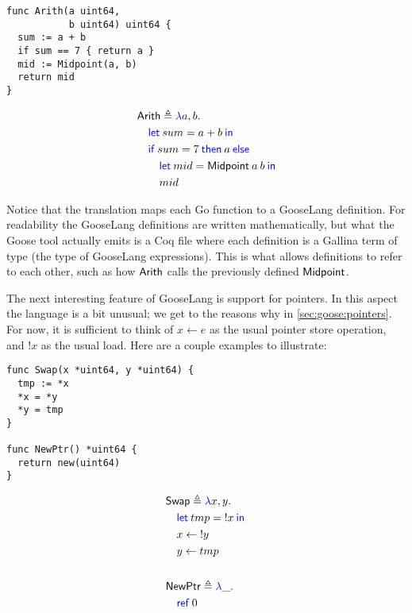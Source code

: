 \begin{minipage}{0.4\textwidth}
\begin{verbatim}
func Arith(a uint64,
           b uint64) uint64 {
  sum := a + b
  if sum == 7 { return a }
  mid := Midpoint(a, b)
  return mid
}
\end{verbatim}
\end{minipage}%
%
\begin{minipage}{0.5\textwidth}
\begin{align*}
  &\mathsf{Arith} \triangleq \mathsf{\textcolor{blue}{\lambda}}a, b.\, \\
  &\quad\mathsf{\textcolor{blue}{let}} \: sum = a + b \:\mathsf{\textcolor{blue}{in}}\: \\
  &\quad\mathsf{\textcolor{blue}{if}} \: sum = 7 \:\mathsf{\textcolor{blue}{then}}\: a \:\mathsf{\textcolor{blue}{else}} \\
  &\quad\quad \mathsf{\textcolor{blue}{let}} \: mid = \mathsf{Midpoint}\: a \: b \:\mathsf{\textcolor{blue}{in}}\\
  &\quad\quad mid \\
\end{align*}
\end{minipage}

Notice that the translation maps each Go function to a GooseLang definition. For
readability the GooseLang definitions are written mathematically, but what the
Goose tool actually emits is a Coq file where each definition is a Gallina term
of type  (the type of GooseLang expressions). This is what allows
definitions to refer to each other, such as how $\mathsf{Arith}$ calls the
previously defined $\mathsf{Midpoint}$.

The next interesting feature of GooseLang is support for pointers. In this
aspect the language is a bit unusual; we get to the reasons why in
\autoref{sec:goose:pointers}. For now, it is sufficient to think of $x \gets e$
as the usual pointer store operation, and $!x$ as the usual load. Here are a couple
examples to illustrate:

\begin{minipage}{0.4\textwidth}
\begin{verbatim}
func Swap(x *uint64, y *uint64) {
  tmp := *x
  *x = *y
  *y = tmp
}

func NewPtr() *uint64 {
  return new(uint64)
}
\end{verbatim}
\end{minipage}%
%
\begin{minipage}{0.5\textwidth}
\begin{align*}
  &\mathsf{Swap} \triangleq \mathsf{\textcolor{blue}{\lambda}}x, y.\, \\
  &\quad\mathsf{\textcolor{blue}{let}} \: tmp = {} !x \:\mathsf{\textcolor{blue}{in}}\: \\
  &\quad x \gets {} !y \\
  &\quad y \gets tmp\\
  \\
  &\mathsf{NewPtr} \triangleq \mathsf{\textcolor{blue}{\lambda}}\_.\, \\
  &\quad \mathsf{\textcolor{blue}{ref}} \: 0
\end{align*}
\end{minipage}

